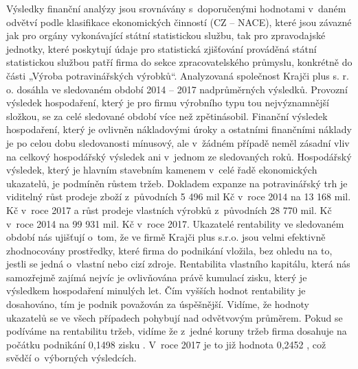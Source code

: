 Výsledky finanční analýzy jsou srovnávány s~doporučenými hodnotami v~daném odvětví podle klasifikace ekonomických činností (CZ – NACE), které jsou závazné jak pro orgány vykonávající státní statistickou službu, tak pro zpravodajské jednotky, které poskytují údaje pro statistická zjišťování prováděná státní statistickou službou patří firma do sekce zpracovatelského průmyslu, konkrétně do části „Výroba potravinářských výrobků“. Analyzovaná společnost Krajči plus s. r. o. dosáhla ve sledovaném období 2014 – 2017 nadprůměrných výsledků. Provozní výsledek hospodaření, který je pro firmu výrobního typu tou nejvýznamnější složkou, se za celé sledované období více než zpětinásobil. Finanční výsledek hospodaření, který je ovlivněn nákladovými úroky a ostatními finančními náklady je po celou dobu sledovanosti mínusový, ale v~žádném případě neměl zásadní vliv na celkový hospodářský výsledek ani v~jednom ze sledovaných roků. Hospodářský výsledek, který je hlavním stavebním kamenem v~celé řadě ekonomických ukazatelů, je podmíněn růstem tržeb. Dokladem expanze na potravinářský trh je viditelný růst prodeje zboží z~původních 5 496 mil Kč v~roce 2014 na 13 168 mil. Kč v~roce 2017 a růst prodeje vlastních výrobků z~původních 28 770 mil. Kč v~roce 2014 na 99 931 mil. Kč v~roce 2017.
Ukazatelé rentability ve sledovaném období nás ujišťují o~tom, že ve firmě Krajči plus s.r.o. jsou velmi efektivně zhodnocovány prostředky, které firma do podnikání vložila, bez ohledu na to, jestli se jedná o~vlastní nebo cizí zdroje. Rentabilita vlastního kapitálu, která nás samozřejmě zajímá nejvíc je ovlivňována právě kumulací zisku, který je výsledkem hospodaření minulých let. Čím vyšších hodnot rentability je dosahováno, tím je podnik považován za úspěšnější. Vidíme, že hodnoty ukazatelů se ve všech případech pohybují nad odvětvovým průměrem. Pokud se podíváme na rentabilitu tržeb, vidíme že z~jedné koruny tržeb firma dosahuje na počátku podnikání 0,1498 zisku . V~roce 2017 je to již hodnota 0,2452 , což svědčí o~výborných výsledcích.

